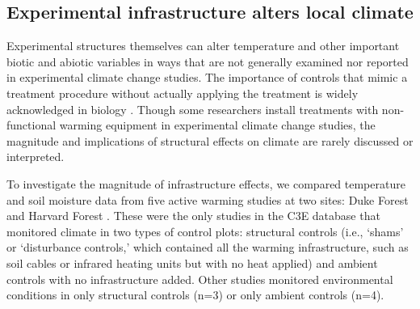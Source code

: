 \documentclass{article}
\begin{document}
\subsection* {Experimental infrastructure alters local climate}
Experimental structures themselves can alter temperature and other important biotic and abiotic variables in ways that are not generally examined nor reported in experimental climate change studies. The importance of controls that mimic a treatment procedure without actually applying the treatment is widely acknowledged in biology \citep[e.g.,][]{spector2001,johnson2002,quinn2002}. Though some researchers install treatments with non-functional warming equipment in experimental climate change studies, the magnitude and implications of structural effects on climate are rarely discussed or interpreted.
\par To investigate the magnitude of infrastructure effects, we compared temperature and soil moisture data from five active warming studies at two sites: Duke Forest and Harvard Forest \citep{farnsworth1995,clark2014b, marchin2015, pelini2011}. These were the only studies in the C3E database that monitored climate in two types of control plots: structural controls (i.e., `shams' or `disturbance controls,' which contained all the warming infrastructure, such as soil cables or infrared heating units but with no heat applied) and ambient controls with no infrastructure added. Other studies monitored environmental conditions in only structural controls (n=3) or only ambient controls (n=4).
\end{document}
